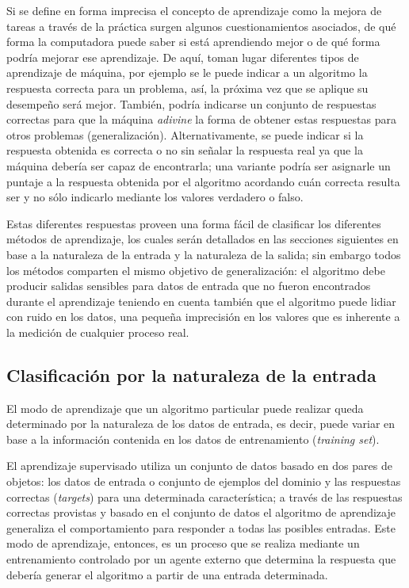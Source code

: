 Si se define en forma imprecisa el concepto de aprendizaje como la
mejora de tareas a través de la práctica surgen algunos cuestionamientos
asociados, de qué forma la computadora puede saber si está aprendiendo
mejor o de qué forma podría mejorar ese aprendizaje. De aquí, toman
lugar diferentes tipos de aprendizaje de máquina, por ejemplo se le
puede indicar a un algoritmo la respuesta correcta para un problema,
así, la próxima vez que se aplique su desempeño será mejor. También,
podría indicarse un conjunto de respuestas correctas para que la máquina
\emph{adivine} la forma de obtener estas respuestas para otros problemas
(generalización). Alternativamente, se puede indicar si la respuesta
obtenida es correcta o no sin señalar la respuesta real ya que la
máquina debería ser capaz de encontrarla; una variante podría ser
asignarle un puntaje a la respuesta obtenida por el algoritmo acordando
cuán correcta resulta ser y no sólo indicarlo mediante los valores
verdadero o falso. 

Estas diferentes respuestas proveen una forma fácil de clasificar
los diferentes métodos de aprendizaje, los cuales serán detallados
en las secciones siguientes en base a la naturaleza de la entrada
y la naturaleza de la salida; sin embargo todos los métodos comparten
el mismo objetivo de generalización: el algoritmo debe producir salidas
sensibles para datos de entrada que no fueron encontrados durante
el aprendizaje teniendo en cuenta también que el algoritmo puede lidiar
con ruido en los datos, una pequeña imprecisión en los valores que
es inherente a la medición de cualquier proceso real. 


\subsection{Clasificación por la naturaleza de la entrada}

El modo de aprendizaje que un algoritmo particular puede realizar
queda determinado por la naturaleza de los datos de entrada, es decir,
puede variar en base a la información contenida en los datos de entrenamiento
(\emph{training set}). 

El aprendizaje supervisado utiliza un conjunto de datos basado en
dos pares de objetos: los datos de entrada o conjunto de ejemplos
del dominio y las respuestas correctas (\emph{targets}) para una determinada
característica; a través de las respuestas correctas provistas y basado
en el conjunto de datos el algoritmo de aprendizaje generaliza el
comportamiento para responder a todas las posibles entradas. Este
modo de aprendizaje, entonces, es un proceso que se realiza mediante
un entrenamiento controlado por un agente externo que determina la
respuesta que debería generar el algoritmo a partir de una entrada
determinada. 

